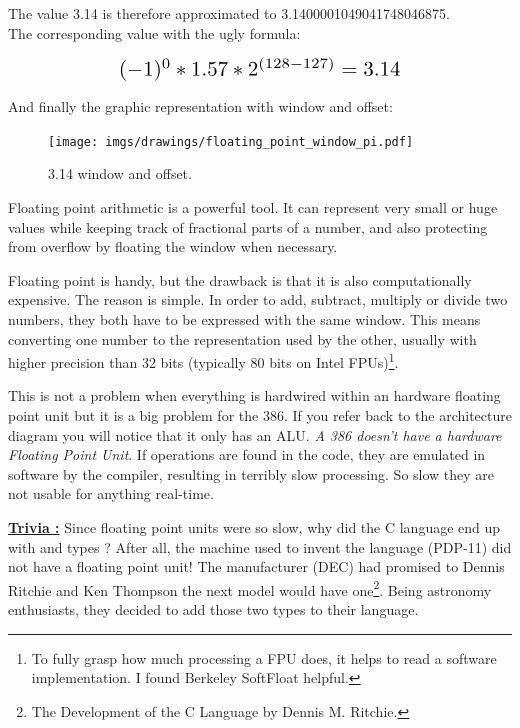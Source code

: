 \documentclass[book.tex]{subfiles}
\begin{document}
The value 3.14 is therefore approximated to 3.1400001049041748046875.\\

The corresponding value with the ugly formula:

\begin{equation*}
\scalebox{1.5}{
$(-1)^0 * 1.57 * 2^{(128-127)} = 3.14$
}
\end{equation*}

\par

And finally the graphic representation with window and offset:\\

\begin{figure}[H]
\centering
\texttt{[image: imgs/drawings/floating\_point\_window\_pi.pdf]}

\caption{3.14 window and offset.}
\label{fig:fp_internals}
\end{figure}
  \bigskip

Floating point arithmetic is a powerful tool. It can represent very small or huge values while keeping track of fractional parts of a number, and also protecting from overflow by floating the window when necessary.\\
\par
Floating point is handy, but the drawback is that it is also computationally expensive. The reason is simple. In order to add, subtract, multiply or divide two numbers, they both have to be expressed with the same window. This means converting one number to the representation used by the other, usually with higher precision than 32 bits (typically 80 bits on Intel FPUs)\footnote{To fully grasp how much processing a FPU does, it helps to read a software implementation. I found Berkeley SoftFloat helpful.}.\\
\par
This is not a problem when everything is hardwired within an hardware floating point unit but it is a big problem for the 386. If you refer back to the architecture diagram you will notice that it only has an ALU. \emph{A 386 doesn't have a hardware Floating Point Unit}. If  operations are found in the code, they are emulated in software by the compiler, resulting in terribly slow processing. So slow they are not usable for anything real-time.\\ 
\par


 \textbf{\underline{Trivia :}} Since floating point units were so slow, why did the C language end up with  and  types ? After all, the machine used to invent the language (PDP-11) did not have a floating point unit! The manufacturer (DEC) had promised to Dennis Ritchie and Ken Thompson the next model would have one\footnote{The Development of the C Language by Dennis M. Ritchie.}. Being astronomy enthusiasts, they decided to add those two types to their language.\\
\par
\end{document}
